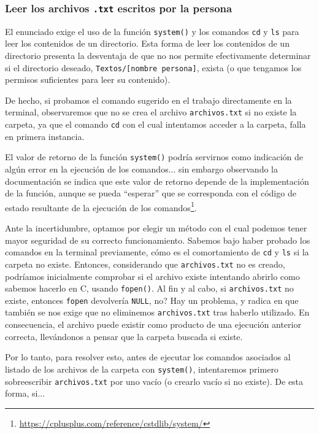 \documentclass[a4paper]{article}
\begin{document}
\subsubsection{Leer los archivos \texttt{.txt} escritos por la persona}

El enunciado exige el uso de la función \texttt{system()} y los comandos \texttt{cd} y \texttt{ls} para leer los contenidos de un directorio. Esta forma de leer los contenidos de un directorio presenta la desventaja de que no nos permite efectivamente determinar si el directorio deseado, \texttt{Textos/[nombre persona]}, exista (o que tengamos los permisos suficientes para leer su contenido).

De hecho, si probamos el comando sugerido en el trabajo directamente en la terminal, observaremos que no se crea el archivo \texttt{archivos.txt} si no existe la carpeta, ya que el comando \texttt{cd} con el cual intentamos acceder a la carpeta, falla en primera instancia.

El valor de retorno de la función \texttt{system()} podría servirnos como indicación de algún error en la ejecución de los comandos... sin embargo observando la documentación se indica que este valor de retorno depende de la implementación de la función, aunque se pueda ``esperar'' que se corresponda con el código de estado resultante de la ejecución de los comandos\footnote{\url{https://cplusplus.com/reference/cstdlib/system/}}.

Ante la incertidumbre, optamos por elegir un método con el cual podemos tener mayor seguridad de su correcto funcionamiento. Sabemos bajo haber probado los comandos en la terminal previamente, cómo es el comortamiento de \texttt{cd} y \texttt{ls} si la carpeta no existe. Entonces, considerando que \texttt{archivos.txt} no es creado, podríamos inicialmente comprobar si el archivo existe intentando abrirlo como sabemos hacerlo en C, usando \texttt{fopen()}. Al fin y al cabo, si \texttt{archivos.txt} no existe, entonces \texttt{fopen} devolvería \texttt{NULL}, no? Hay un problema, y radica en que también se nos exige que no eliminemos \texttt{archivos.txt} tras haberlo utilizado. En consecuencia, el archivo puede existir como producto de una ejecución anterior correcta, llevándonos a pensar que la carpeta buscada si existe.

Por lo tanto, para resolver esto, antes de ejecutar los comandos asociados al listado de los archivos de la carpeta con \texttt{system()}, intentaremos primero sobreescribir \texttt{archivos.txt} por uno vacío (o crearlo vacío si no existe). De esta forma, si...
\end{document}
